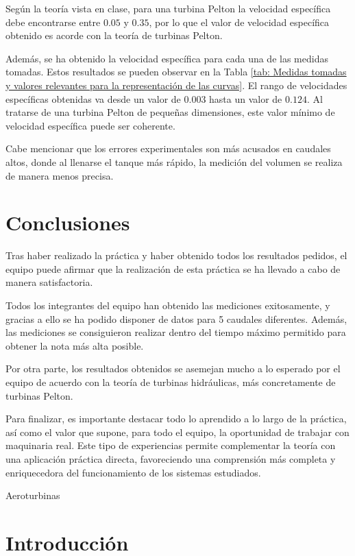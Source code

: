 \documentclass[10pt]{IEEEtran}
\begin{document}
Según la teoría vista en clase, para una turbina Pelton la velocidad específica debe encontrarse entre $0.05$ y $0.35$, por lo que el valor de velocidad específica obtenido es acorde con la teoría de turbinas Pelton.

Además, se ha obtenido la velocidad específica para cada una de las medidas tomadas. Estos resultados se pueden observar en la Tabla \ref{tab: Medidas tomadas y valores relevantes para la representación de las curvas}. El rango de velocidades específicas obtenidas va desde un valor de $0.003$ hasta un valor de $0.124$. Al tratarse de una turbina Pelton de pequeñas dimensiones, este valor mínimo de velocidad específica puede ser coherente.

Cabe mencionar que los errores experimentales son más acusados en caudales altos, donde al llenarse el tanque más rápido, la medición del volumen se realiza de manera menos precisa.

\section{Conclusiones}
Tras haber realizado la práctica y haber obtenido todos los resultados pedidos, el equipo puede afirmar que la realización de esta práctica se ha llevado a cabo de manera satisfactoria.

Todos los integrantes del equipo han obtenido las mediciones exitosamente, y gracias a ello se ha podido disponer de datos para 5 caudales diferentes. Además, las mediciones se consiguieron realizar dentro del tiempo máximo permitido para obtener la nota más alta posible.

Por otra parte, los resultados obtenidos se asemejan mucho a lo esperado por el equipo de acuerdo con la teoría de turbinas hidráulicas, más concretamente de turbinas Pelton.

Para finalizar, es importante destacar todo lo aprendido a lo largo de la práctica, así como el valor que supone, para todo el equipo, la oportunidad de trabajar con maquinaria real. Este tipo de experiencias permite complementar la teoría con una aplicación práctica directa, favoreciendo una comprensión más completa y enriquecedora del funcionamiento de los sistemas estudiados.

\pagebreak
{\LARGE Aeroturbinas}
\setcounter{section}{0}
\setcounter{subsection}{0}
\setcounter{subsubsection}{0}

\section{Introducción}
\end{document}
